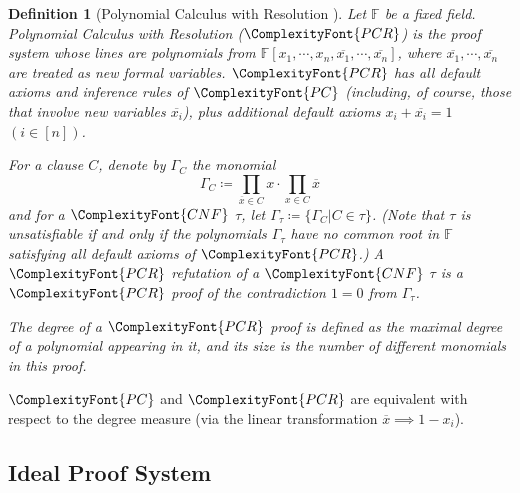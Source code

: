 \documentclass[11pt,letter]{article}
\newtheorem{definition}[theorem]{Definition}
\theoremstyle{remark} %
\newcommand{\CNF}{ %
    {
        \ComplexityFont{CNF}
    }
}
\newcommand{\PC}{ %
    {
        \ComplexityFont{PC}
    }
}
\newcommand{\PCR}{ %
    {
        \ComplexityFont{PCR}
    }
}
\begin{document}
{        \begin{definition}[Polynomial Calculus with Resolution \cite{MR1919962}]
            \label{def: PCR}
             Let $\mathbb{F}$ be a fixed field. \emph{Polynomial Calculus with Resolution} ($\PCR$) is the proof system whose lines are polynomials from $\mathbb{F}[x_1,\cdots,x_n,\overline{x_1},\cdots,\overline{x_n}]$, where $\overline{x_1},\cdots,\overline{x_n}$ are treated as new formal variables. $\PCR$ has all default axioms and inference rules of $\PC$ (including, of course, those that involve new variables $\overline{x_i}$), plus additional default axioms $x_i + \overline{x_i}=1$ $(i \in [n])$.
    
            For a clause $C$, denote by $\Gamma_C$ the monomial
            \begin{equation*}
                \Gamma_C \coloneqq \prod_{\overline{x} \in C} x \cdot \prod_{x \in C} \overline{x}
            \end{equation*}
            and for a $\CNF$ $\tau$, let $\Gamma_\tau \coloneqq \{\Gamma_C | C \in \tau \}$. (Note that $\tau$ is unsatisfiable if and only if the polynomials $\Gamma_\tau$ have no common root in $\mathbb{F}$ satisfying all default axioms of $\PCR$.) A \emph{$\PCR$ refutation} of a $\CNF$ $\tau$ is a $\PCR$ proof of the contradiction $1=0$ from $\Gamma_\tau$.
    
            The \emph{degree} of a $\PCR$ proof is defined as the maximal degree of a polynomial appearing in it, and its \emph{size} is the number of different \emph{monomials} in this proof.
        \end{definition}
    
        $\PC$ and $\PCR$ are equivalent with respect to the degree measure (via the linear transformation $\overline{x} \implies 1- x_i$).


     \subsection{Ideal Proof System}
    
}
\end{document}
